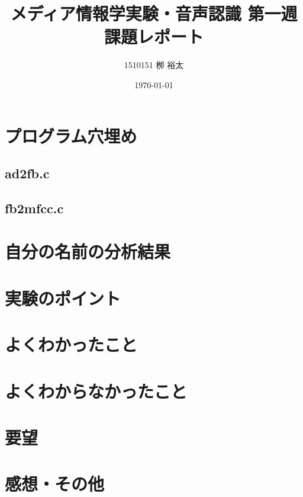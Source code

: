 \documentclass[11pt,a4paper, uplatex]{jsarticle}
\title{メディア情報学実験・音声認識 第一週課題レポート}
\author{1510151  栁 裕太}
\date{\today}
\begin{document}
\maketitle
\section{プログラム穴埋め}

\subsection{ad2fb.c}
\subsection{fb2mfcc.c}

\section{自分の名前の分析結果}

\section{実験のポイント}

\section{よくわかったこと}

\section{よくわからなかったこと}

\section{要望}

\section{感想・その他}
\end{document}
